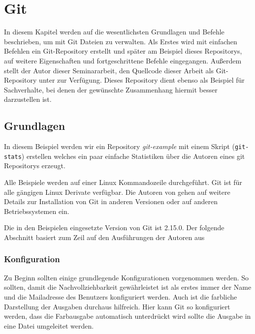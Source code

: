 \chapter{Git}\label{cha:Git}
In diesem Kapitel werden auf die wesentlichsten Grundlagen und Befehle
beschrieben, um mit Git Dateien zu verwalten. Als Erstes wird mit einfachen
Befehlen ein Git-Repository erstellt und später am Beispiel dieses Repositorys,
auf weitere Eigenschaften und fortgeschrittene Befehle eingegangen.
Außerdem stellt der Autor dieser Seminararbeit, den Quellcode dieser Arbeit als
Git-Repository unter \cite{link:seminararbeit} zur Verfügung. Dieses Repository
dient ebenso als Beispiel für Sachverhalte, bei denen der gewünschte
Zusammenhang hiermit besser darzustellen ist.

\section{Grundlagen}\label{gitbasics}
In diesem Beispiel werden wir ein Repository \textit{git-example} mit einem
Skript (\texttt{git-stats}) erstellen welches ein paar einfache Statistiken
über die Autoren eines git Repositorys erzeugt.

Alle Beispiele werden auf einer Linux Kommandozeile durchgeführt. Git ist für
alle gängigen Linux Derivate verfügbar. Die Autoren von \cite[S.~12-14]{progit}
gehen auf weitere Details zur Installation von Git in anderen Versionen oder
auf anderen Betriebssystemen ein.

Die in den Beispielen eingesetzte Version von Git ist 2.15.0. Der folgende
Abschnitt basiert zum Zeil auf den Ausführungen der Autoren aus
\cite[S.22-57]{gitops}



\subsection{Konfiguration}\label{gitconfig}
Zu Beginn sollten einige grundlegende Konfigurationen vorgenommen werden. So
sollten, damit die Nachvollziehbarkeit gewährleistet ist als erstes immer der
Name und die Mailadresse des Benutzers konfiguriert werden. Auch ist die
farbliche Darstellung der Ausgaben durchaus hilfreich. Hier kann Git so
konfiguriert werden, dass die Farbausgabe automatisch unterdrückt wird sollte
die Ausgabe in eine Datei umgeleitet werden.



